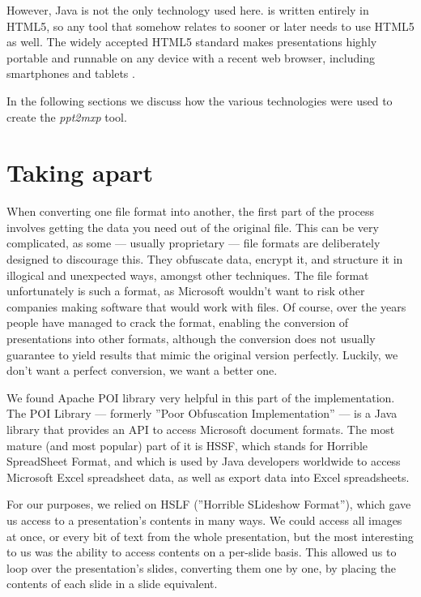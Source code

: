   However, Java is not the only technology used here. \mxp is written entirely
  in HTML5, so any tool that somehow relates to \mxp sooner or later needs to
  use HTML5 as well. The widely accepted HTML5 standard makes \mxp
  presentations highly portable and runnable on any device with a recent web
  browser, including smartphones and tablets \citep{roels-1}.

  In the following sections we discuss how the various technologies were used
  to create the \emph{ppt2mxp} tool.

  \section{Taking \ppt apart}
   \label{poi}

   When converting one file format into another, the first part of the process
   involves getting the data you need out of the original file. This can be
   very complicated, as some --- usually proprietary --- file formats are
   deliberately designed to discourage this. They obfuscate data, encrypt it,
   and structure it in illogical and unexpected ways, amongst other techniques.
   The \ppt file format unfortunately is such a format, as Microsoft wouldn't
   want to risk other companies making software that would work with \ppt
   files. Of course, over the years people have managed to crack the format,
   enabling the conversion of \ppt presentations into other formats, although
   the conversion does not usually guarantee to yield results that mimic the
   original version perfectly. Luckily, we don't want a perfect conversion, we
   want a better one.

   We found Apache POI library very helpful in this part of the implementation.
   The POI Library --- formerly ''Poor Obfuscation Implementation''
   \citep{sundaram-1} --- is a Java library that provides an API to access
   Microsoft document formats. The most mature (and most popular) part of it is
   HSSF, which stands for Horrible SpreadSheet Format, and which is used by
   Java developers worldwide to access Microsoft Excel spreadsheet data, as
   well as export data into Excel spreadsheets.

   For our purposes, we relied on HSLF (''Horrible SLideshow Format''), which
   gave us access to a \ppt presentation's contents in many ways. We could
   access all images at once, or every bit of text from the whole presentation,
   but the most interesting to us was the ability to access contents on a
   per-slide basis. This allowed us to loop over the presentation's slides,
   converting them one by one, by placing the contents of each slide in a \mxp
   slide equivalent.

